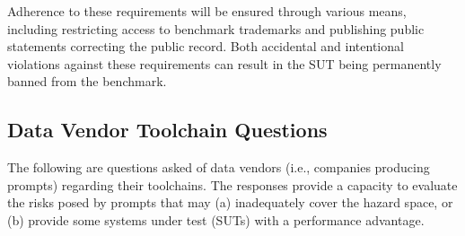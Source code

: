 Adherence to these requirements will be ensured through various means, including restricting access to benchmark trademarks and publishing public statements correcting the public record. Both accidental and intentional violations against these requirements can result in the SUT being permanently banned from the benchmark.


\subsection{Data Vendor Toolchain Questions}
The following are questions asked of data vendors (i.e., companies producing prompts) regarding their toolchains. The responses provide a capacity to evaluate the risks posed by prompts that may (a) inadequately cover the hazard space, or (b) provide some systems under test (SUTs) with a performance advantage.

